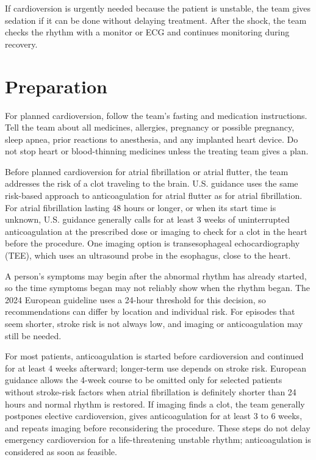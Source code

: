 If cardioversion is urgently needed because the patient is unstable, the team gives sedation if it can be done without delaying treatment. After the shock, the team checks the rhythm with a monitor or ECG and continues monitoring during recovery.

\section*{Preparation}
For planned cardioversion, follow the team's fasting and medication instructions. Tell the team about all medicines, allergies, pregnancy or possible pregnancy, sleep apnea, prior reactions to anesthesia, and any implanted heart device. Do not stop heart or blood-thinning medicines unless the treating team gives a plan.

Before planned cardioversion for atrial fibrillation or atrial flutter, the team addresses the risk of a clot traveling to the brain. U.S. guidance uses the same risk-based approach to anticoagulation for atrial flutter as for atrial fibrillation. For atrial fibrillation lasting 48 hours or longer, or when its start time is unknown, U.S. guidance generally calls for at least 3 weeks of uninterrupted anticoagulation at the prescribed dose or imaging to check for a clot in the heart before the procedure. One imaging option is transesophageal echocardiography (TEE), which uses an ultrasound probe in the esophagus, close to the heart.

A person's symptoms may begin after the abnormal rhythm has already started, so the time symptoms began may not reliably show when the rhythm began. The 2024 European guideline uses a 24-hour threshold for this decision, so recommendations can differ by location and individual risk. For episodes that seem shorter, stroke risk is not always low, and imaging or anticoagulation may still be needed.

For most patients, anticoagulation is started before cardioversion and continued for at least 4 weeks afterward; longer-term use depends on stroke risk. European guidance allows the 4-week course to be omitted only for selected patients without stroke-risk factors when atrial fibrillation is definitely shorter than 24 hours and normal rhythm is restored. If imaging finds a clot, the team generally postpones elective cardioversion, gives anticoagulation for at least 3 to 6 weeks, and repeats imaging before reconsidering the procedure. These steps do not delay emergency cardioversion for a life-threatening unstable rhythm; anticoagulation is considered as soon as feasible.

